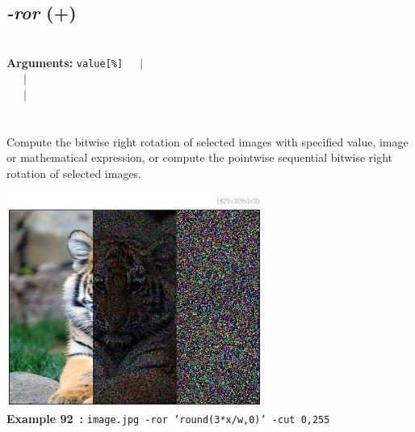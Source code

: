 \documentclass[a4paper,11pt,twoside]{book}
\begin{document}
\subsection{\emph{-ror} (+)}\vspace*{-0.5em}
~\\\textbf{Arguments: } 
{\small \texttt{value[\%]}}~~~$|$\\
\hspace*{2.2cm}{\small \texttt{[image]}}~~~$|$\\
~~~$|$\\
\\~\\
Compute the bitwise right rotation of selected images with specified value, image or
mathematical expression, or compute the pointwise sequential bitwise right rotation of
selected images.
\begin{center}\includegraphics[keepaspectratio=true,height=7cm,width=\textwidth]{img/gmic_def92.jpg}\\
{\footnotesize \textbf{Example 92~:} \texttt{image.jpg -ror 'round(3*x/w,0)' -cut 0,255}}
\end{center}
\end{document}
